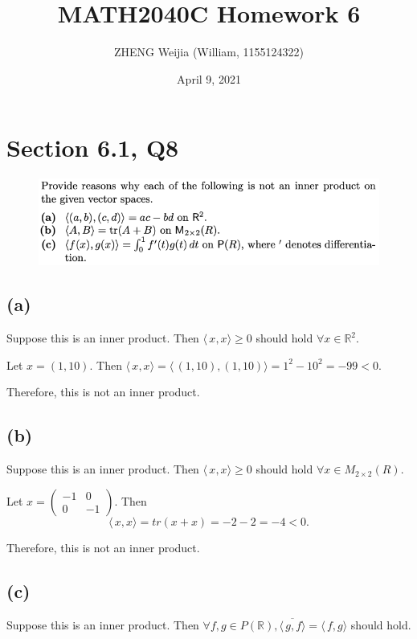 \documentclass[12pt]{article}%
\begin{document}
\title{MATH2040C Homework 6}
\author{ZHENG Weijia (William, 1155124322)}
\date{April 9, 2021}
\maketitle



\section{Section 6.1, Q8}

\begin{figure}[htp]
    \centering %
    \includegraphics[width = 16cm]{img/Q1.png}
\end{figure}

\subsection{(a)}
Suppose this is an inner product. Then $\langle\, x,x \rangle \geq 0$ should hold $\forall x \in \mathbb{R}^2.$

Let $x=(1,10).$ Then $\langle\, x,x \rangle=\langle\, (1,10),(1,10) \rangle=1^2-10^2=-99<0.$

Therefore, this is not an inner product.

\subsection{(b)}
Suppose this is an inner product. Then $\langle\, x,x \rangle \geq 0$ should hold $\forall x \in M_{2\times 2}(R).$

Let $x=\begin{pmatrix} -1&0\\0&-1\end{pmatrix}$. Then $$\langle\, x,x \rangle=tr(x+x)=-2-2=-4<0.$$

Therefore, this is not an inner product.

\subsection{(c)}
Suppose this is an inner product. Then $\forall f,g \in P(\mathbb{R}), \overline{\langle\, g,f \rangle}=\langle\, f,g \rangle$ should hold.
\end{document}
